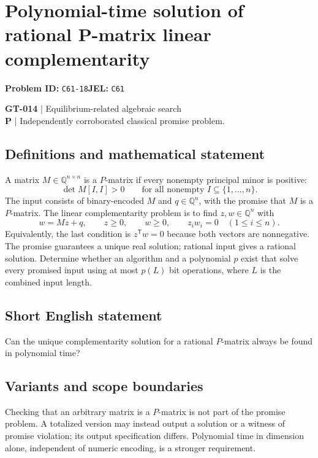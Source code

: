 \documentclass[11pt,a4paper]{article}
\begin{document}
\section*{Polynomial-time solution of rational P-matrix linear complementarity}
\textbf{Problem ID:} \texttt{C61-18}\quad \textbf{JEL:} \texttt{C61}\par
\label{problem:OP-0144}
\label{game:GT-014}
{\sffamily\small\color{muted}
\textbf{GT-014} | Equilibrium-related algebraic search\\
\textbf{P} | Independently corroborated classical promise problem.
\par}
\subsection*{Definitions and mathematical statement}
A matrix $M\in\mathbb Q^{n\times n}$ is a $P$-matrix if every nonempty principal minor is positive:
\[
 \det M[I,I]>0\qquad\text{for all nonempty }I\subseteq\{1,\ldots,n\}.
\]
The input consists of binary-encoded $M$ and $q\in\mathbb Q^n$, with the promise that $M$ is a $P$-matrix. The linear complementarity problem is to find $z,w\in\mathbb Q^n$ with
\[
 w=Mz+q,\qquad z\geq0,\qquad w\geq0,\qquad
 z_iw_i=0\quad(1\leq i\leq n).
\]
Equivalently, the last condition is $z^{\mathsf T}w=0$ because both vectors are nonnegative. The promise guarantees a unique real solution; rational input gives a rational solution. Determine whether an algorithm and a polynomial $p$ exist that solve every promised input using at most $p(L)$ bit operations, where $L$ is the combined input length.
\subsection*{Short English statement}
Can the unique complementarity solution for a rational $P$-matrix always be found in polynomial time?
\subsection*{Variants and scope boundaries}
Checking that an arbitrary matrix is a $P$-matrix is not part of the promise problem. A totalized version may instead output a solution or a witness of promise violation; its output specification differs. Polynomial time in dimension alone, independent of numeric encoding, is a stronger requirement.
\end{document}
